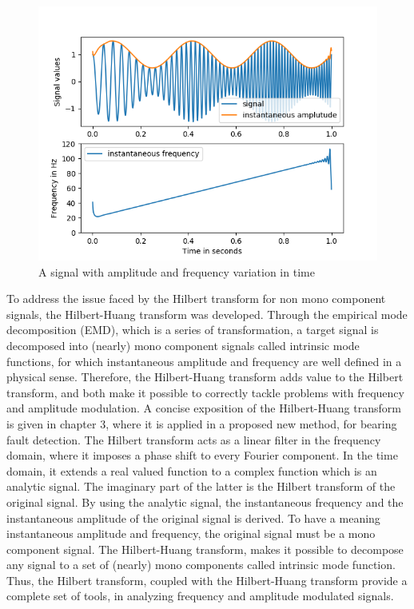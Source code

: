 \documentclass[../Main/thesis.tex]{subfiles}
\begin{document}
\begin{figure}[H]
	\centering
	\includegraphics[width=1\linewidth]{../fig/inst}
	\caption{A signal with amplitude and frequency variation in time}
	\label{fig:inst}
\end{figure}
\justify
 To address the issue faced by the Hilbert transform for non mono component signals, the Hilbert-Huang transform was developed. Through the empirical mode decomposition (EMD), which is a series of transformation, a target signal is decomposed into (nearly) mono component signals called intrinsic mode functions, for which instantaneous amplitude and frequency are well defined in a physical sense. Therefore, the Hilbert-Huang transform adds value to the Hilbert transform, and both make it possible to correctly tackle problems with frequency and amplitude modulation. A concise exposition of the Hilbert-Huang transform is given in chapter 3, where it is applied in a proposed new method, for bearing fault detection. 
\justify
The Hilbert transform acts as a linear filter in the frequency domain, where it imposes a phase shift to every Fourier component. In the time domain, it extends a real valued function to a complex function which is an analytic signal. The imaginary part of the latter is the Hilbert transform of the original signal. By using the analytic signal, the instantaneous frequency and the instantaneous amplitude of the original signal is derived. To have a meaning instantaneous amplitude and frequency, the original signal must be a mono component signal. The Hilbert-Huang transform, makes it possible to decompose any signal to a set of (nearly) mono components called intrinsic mode function. Thus, the Hilbert transform, coupled with the Hilbert-Huang transform provide a complete set of tools, in analyzing frequency and amplitude modulated signals.
  
\end{document}
